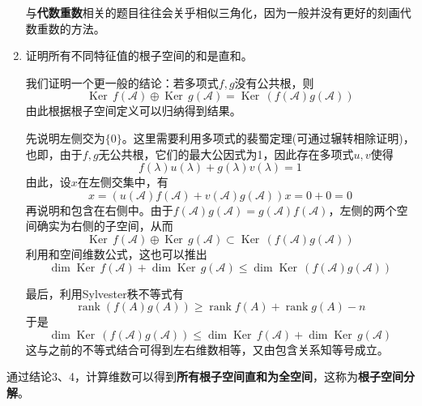\documentclass[a4paper,UTF8,fontset=windows]{ctexart}
\DeclareMathOperator{\rank}{rank}
\DeclareMathOperator{\Ker}{Ker\,}
\newcommand*{\ma}{\mathcal{A}}
\newcommand*{\note}{\noindent *}
\begin{document}
\begin{enumerate}
    \note 与\textbf{代数重数}相关的题目往往会关乎相似三角化，因为一般并没有更好的刻画代数重数的方法。

    \item 证明所有不同特征值的根子空间的和是直和。
    
    我们证明一个更一般的结论：若多项式$f,g$没有公共根，则
    $$\Ker f(\ma)\oplus\Ker g(\ma)=\Ker(f(\ma)g(\ma))$$
    由此根据根子空间定义可以归纳得到结果。

    先说明左侧交为$\{0\}$。这里需要利用多项式的裴蜀定理(可通过辗转相除证明)，也即，由于$f,g$无公共根，它们的最大公因式为1，因此存在多项式$u,v$使得
    $$f(\lambda)u(\lambda)+g(\lambda)v(\lambda)=1$$
    由此，设$x$在左侧交集中，有
    $$x=(u(\ma)f(\ma)+v(\ma)g(\ma))x=0+0=0$$
    再说明和包含在右侧中。由于$f(\ma)g(\ma)=g(\ma)f(\ma)$，左侧的两个空间确实为右侧的子空间，从而
    $$\Ker f(\ma)\oplus\Ker g(\ma)\subset\Ker(f(\ma)g(\ma))$$
    利用和空间维数公式，这也可以推出
    $$\dim\Ker f(\ma)+\dim\Ker g(\ma)\le\dim\Ker(f(\ma)g(\ma))$$
    
    最后，利用Sylvester秩不等式有
    $$\rank(f(A)g(A))\ge\rank f(A)+\rank g(A)-n$$
    于是
    $$\dim\Ker(f(\ma)g(\ma))\le\dim\Ker f(\ma)+\dim\Ker g(\ma)$$
    这与之前的不等式结合可得到左右维数相等，又由包含关系知等号成立。
\end{enumerate}

\note 通过结论3、4，计算维数可以得到\textbf{所有根子空间直和为全空间}，这称为\textbf{根子空间分解}。
\end{document}
